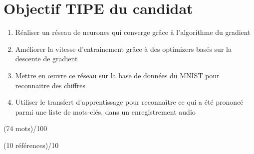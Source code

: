 \documentclass[12pt,a4paper, french]{article}
\begin{document}
\section*{Objectif TIPE du candidat}
\begin{enumerate}
    \item Réaliser un réseau de neurones qui converge grâce à l’algorithme du gradient
    \item Améliorer la vitesse d'entrainement grâce à des optimizers basés sur la descente de gradient
    \item Mettre en \oe uvre ce réseau sur la base de données du MNIST pour reconnaitre des chiffres
    \item Utiliser le transfert d'apprentissage pour reconnaître ce qui a été prononcé parmi une liste de mots-clés, dans un enregistrement audio
\end{enumerate}
(74 mots)/100


\newpage
 (10 références)/10

\end{document}
